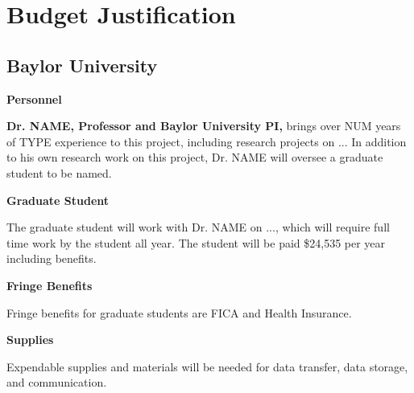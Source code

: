 \section*{Budget Justification}
\subsection*{Baylor University}

\textbf{Personnel}

\textbf{Dr. NAME, Professor and Baylor University PI,} brings over NUM years of TYPE experience to this project, including research projects on ...  In addition to his own research work on this project, Dr. NAME will oversee a graduate student to be named.

\textbf{Graduate Student}

The graduate student will work with Dr.  NAME on ..., which will require
full time work by the student all year. The student will be paid \$24,535 per year including benefits.

\textbf{Fringe Benefits}

Fringe benefits for graduate students are FICA and Health Insurance.  %

\textbf{Supplies}

Expendable supplies and materials will be needed for data transfer, data storage, and communication.
